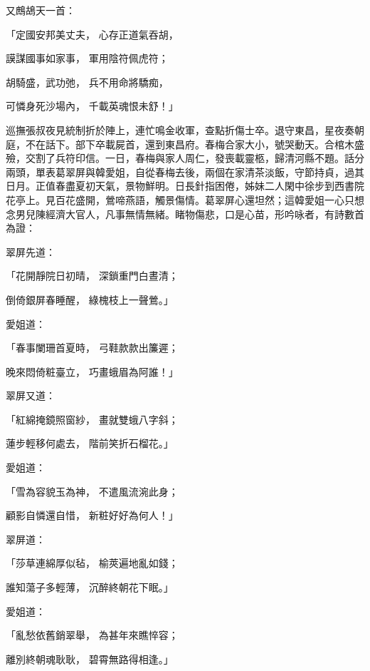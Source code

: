 又鷓鴣天一首：

「定國安邦美丈夫，  心存正道氣吞胡，

謨謀國事如家事，  軍用陰符佩虎符；

胡騎盛，武功弛，  兵不用命將驕痴，

可憐身死沙場內，  千載英魂恨未舒！」

巡撫張叔夜見統制折於陣上，連忙鳴金收軍，查點折傷士卒。退守東昌，星夜奏朝庭，不在話下。部下卒載屍首，還到東昌府。春梅合家大小，號哭動天。合棺木盛殮，交割了兵符印信。一日，春梅與家人周仁，發喪載靈柩，歸清河縣不題。話分兩頭，單表葛翠屏與韓愛姐，自從春梅去後，兩個在家清茶淡飯，守節持貞，過其日月。正值春盡夏初天氣，景物鮮明。日長針指困倦，姊妹二人閑中徐步到西書院花亭上。見百花盛開，鶯啼燕語，觸景傷情。葛翠屏心還坦然；這韓愛姐一心只想念男兒陳經濟大官人，凡事無情無緒。睹物傷悲，口是心苗，形吟咏者，有詩數首為證：

翠屏先道：

「花開靜院日初晴，  深鎖重門白晝清；

倒倚銀屏春睡醒，  綠槐枝上一聲鶯。」

愛姐道：

「春事闌珊首夏時，  弓鞋款款出簾遲；

晚來悶倚粧臺立，  巧畫蛾眉為阿誰！」

翠屏又道：

「紅綿掩鏡照窗紗，  畫就雙蛾八字斜；

蓮步輕移何處去，  階前笑折石榴花。」

愛姐道：

「雪為容貌玉為神，  不遣風流涴此身；

顧影自憐還自惜，  新粧好好為何人！」

翠屏道：

「莎草連綿厚似毡，  榆莢遍地亂如錢；

誰知蕩子多輕薄，  沉醉終朝花下眠。」

愛姐道：

「亂愁依舊銷翠舉，  為甚年來瞧悴容；

離別終朝魂耿耿，  碧霄無路得相逢。」

